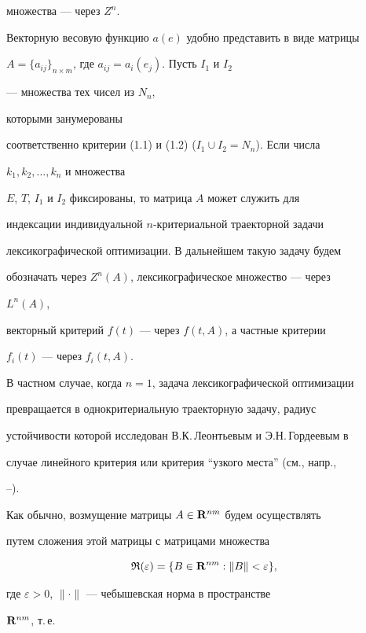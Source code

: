 множества --- через $Z^n$. 


 


Векторную весовую функцию $a(e)$ удобно представить в виде матрицы 


$A=\{a_{ij}\}_{n\times m}$, где $a_{ij}=a_i(e_j)$. Пусть $I_1$ и $I_2$ 


--- множества тех чисел из $N_n$, 


которыми занумерованы 


соответственно критерии (1.1) и (1.2) ($I_1\cup I_2=N_n$). Если числа 


$k_1,k_2,\dotsc,k_n$ и множества 


$E$, $T$, $I_1$ и $I_2$ фиксированы, то матрица $A$ может служить для 


индексации индивидуальной $n$-критериальной траекторной задачи 


лексикографической оптимизации. В дальнейшем такую задачу будем 


обозначать через $Z^n(A)$, лексикографическое множество --- через 


$L^n(A)$, 


векторный критерий $f(t)$ --- через $f(t,A)$, а частные критерии 


$f_i(t)$ --- через $f_i(t,A)$. 


 


В частном случае, когда $n=1$, задача лексикографической оптимизации 


превращается в однокритериальную траекторную задачу, радиус 


устойчивости которой исследован В.К.\,Леонтье\-вым и Э.Н.\,Гордеевым в 


случае линейного критерия или критерия ``узкого места'' (см., напр., 


\cite{4}--\cite{7}). 


 


Как обычно, возмущение матрицы $A\in\bold R^{nm}$ будем осуществлять 


путем сложения этой матрицы с матрицами множества 


$$ 


\frak R(\varepsilon)=\{B\in\bold R^{nm}:\|B\|<\varepsilon\}, 


$$ 


где $\varepsilon>0$, $\|\cdot\|$ --- чебышевская норма в пространстве 


$\bold R^{nm}$, т.\,е. 


